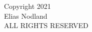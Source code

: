 \begin{center}
\null\vfill
\noindent
Copyright 2021 \\
Elias Nodland \\
ALL RIGHTS RESERVED \\
\vspace{2in}
\end{center}
\newpage
